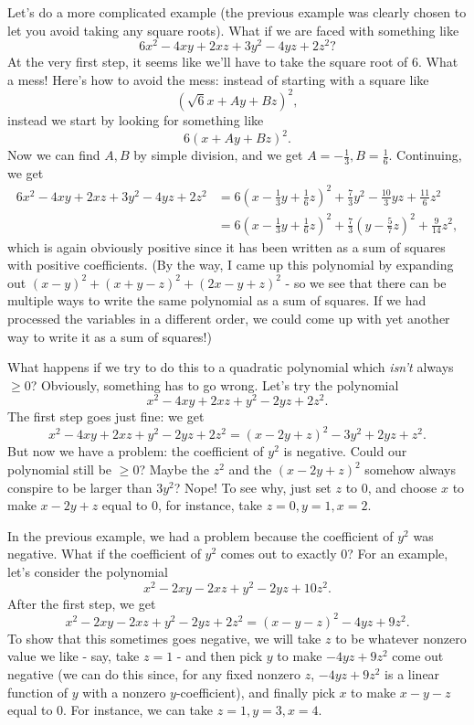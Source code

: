 Let's do a more complicated example (the previous example was clearly chosen to let you avoid taking any square roots). What if we are faced with something like
\[
6x^2 - 4xy + 2xz + 3y^2 - 4yz + 2z^2?
\]
At the very first step, it seems like we'll have to take the square root of $6$. What a mess! Here's how to avoid the mess: instead of starting with a square like
\[
(\sqrt{6}x + Ay + Bz)^2,
\]
instead we start by looking for something like
\[
6(x + Ay + Bz)^2.
\]
Now we can find $A, B$ by simple division, and we get $A = -\frac{1}{3}, B = \frac{1}{6}$. Continuing, we get
\begin{align*}
6x^2 - 4xy + 2xz + 3y^2 - 4yz + 2z^2 &= 6(x - \tfrac{1}{3}y + \tfrac{1}{6}z)^2 + \tfrac{7}{3}y^2 - \tfrac{10}{3}yz + \tfrac{11}{6}z^2\\
&= 6(x - \tfrac{1}{3}y + \tfrac{1}{6}z)^2 + \tfrac{7}{3}(y - \tfrac{5}{7}z)^2 + \tfrac{9}{14}z^2,
\end{align*}
which is again obviously positive since it has been written as a sum of squares with positive coefficients. (By the way, I came up this polynomial by expanding out $(x-y)^2 + (x+y-z)^2 + (2x-y+z)^2$ - so we see that there can be multiple ways to write the same polynomial as a sum of squares. If we had processed the variables in a different order, we could come up with yet another way to write it as a sum of squares!)

What happens if we try to do this to a quadratic polynomial which \emph{isn't} always $\ge 0$? Obviously, something has to go wrong. Let's try the polynomial
\[
x^2 - 4xy + 2xz + y^2 - 2yz + 2z^2.
\]
The first step goes just fine: we get
\[
x^2 - 4xy + 2xz + y^2 - 2yz + 2z^2 = (x - 2y + z)^2 - 3y^2 + 2yz + z^2.
\]
But now we have a problem: the coefficient of $y^2$ is negative. Could our polynomial still be $\ge 0$? Maybe the $z^2$ and the $(x - 2y + z)^2$ somehow always conspire to be larger than $3y^2$? Nope! To see why, just set $z$ to $0$, and choose $x$ to make $x - 2y + z$ equal to $0$, for instance, take $z = 0, y = 1, x = 2$.

In the previous example, we had a problem because the coefficient of $y^2$ was negative. What if the coefficient of $y^2$ comes out to exactly $0$? For an example, let's consider the polynomial
\[
x^2 - 2xy - 2xz + y^2 - 2yz + 10z^2.
\]
After the first step, we get
\[
x^2 - 2xy - 2xz + y^2 - 2yz + 2z^2 = (x - y - z)^2 - 4yz + 9z^2.
\]
To show that this sometimes goes negative, we will take $z$ to be whatever nonzero value we like - say, take $z = 1$ - and then pick $y$ to make $-4yz + 9z^2$ come out negative (we can do this since, for any fixed nonzero $z$, $-4yz + 9z^2$ is a linear function of $y$ with a nonzero $y$-coefficient), and finally pick $x$ to make $x-y-z$ equal to $0$. For instance, we can take $z = 1, y = 3, x = 4$.

